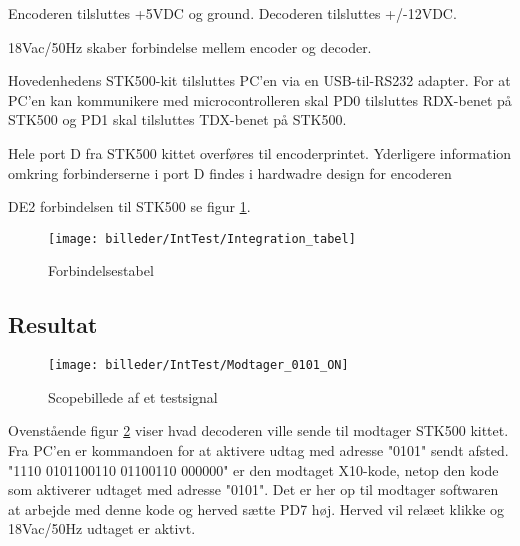 Encoderen tilsluttes +5VDC og ground.
Decoderen tilsluttes +/-12VDC.

18Vac/50Hz skaber forbindelse mellem encoder og decoder.

Hovedenhedens STK500-kit tilsluttes PC'en via en USB-til-RS232 adapter. For at PC'en kan kommunikere med microcontrolleren skal PD0 tilsluttes RDX-benet på STK500 og PD1 skal tilsluttes TDX-benet på STK500. 

Hele port D fra STK500 kittet overføres til encoderprintet. Yderligere information omkring forbinderserne i port D findes i hardwadre design for encoderen

DE2 forbindelsen til STK500 se figur \ref{fig:integration_tabel}.

\begin{figure}[H]
	\centering
	\texttt{[image: billeder/IntTest/Integration\_tabel]}
	\caption{Forbindelsestabel}
	\label{fig:integration_tabel}
\end{figure}

\subsection{Resultat}

\begin{figure}[H]
	\centering
	\texttt{[image: billeder/IntTest/Modtager\_0101\_ON]}
	\caption{Scopebillede af et testsignal}
	\label{fig:Modtager_0101_ON}
\end{figure}

Ovenstående figur \ref{fig:Modtager_0101_ON} viser hvad decoderen ville sende til modtager STK500 kittet. Fra PC'en er kommandoen for at aktivere udtag med adresse "0101" sendt afsted.
"1110 0101100110 01100110 000000" er den modtaget X10-kode, netop den kode som aktiverer udtaget med adresse "0101". Det er her op til modtager softwaren at arbejde med denne kode og herved sætte PD7 høj. Herved vil relæet klikke og 18Vac/50Hz udtaget er aktivt. 